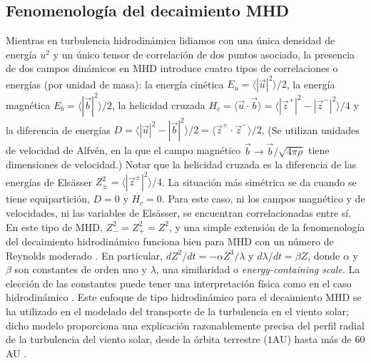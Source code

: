 \subsection{Fenomenología del decaimiento MHD}
Mientras en turbulencia hidrodinámica lidiamos con una única densidad
de energía $u^2$ y un único tensor de correlación de dos puntos
asociado, la presencia de dos campos dinámicos en MHD introduce cuatro
tipos de correlaciones o energías (por unidad de masa): la energía
cinética $E_u = \langle \left| \vec{u}\right|^2\rangle/2$, la energía
magnética $E_b = \langle \left| \vec{b}\right|^2\rangle/2$, la
helicidad cruzada $H_c = \langle \vec{u} \cdot \vec{b} \rangle =
\langle \left| \vec{z}^+\right|^2 - \left| \vec{z}^-\right|^2
\rangle/4$ y la diferencia de energías $D = \langle \left|
\vec{u}\right|^2 - \left| \vec{b} \right|^2 \rangle/2 = \langle
\vec{z}^+ \cdot \vec{z}^- \rangle/2$. (Se utilizan unidades de
velocidad de Alfvén, en la que el campo magnético $\vec{b} \rightarrow
\vec{b}/\sqrt{4\pi\rho}$ tiene dimensiones de velocidad.) Notar que la
helicidad cruzada es la diferencia de las energías de Els\"asser
$Z_\pm^2 = \langle \left| \vec{z}^\pm \right|^2 \rangle/4$. La
situación más simétrica se da cuando se tiene equipartición, $D = 0$ y
$H_c = 0$. Para este caso, ni los campos magnético y de velocidades,
ni las variables de Els\"asser, se encuentran correlacionadas entre
sí. En este tipo de MHD, $Z_-^2 = Z_+^2 = Z^2$, y una simple extensión
de la fenomenología del decaimiento hidrodinámico funciona bien para
MHD con un número de Reynolds moderado
\cite{hossain_phenomenology_1995}. En particular, $dZ^2/dt = -\alpha
Z^3/\lambda$ y $d\lambda/dt = \beta Z$, donde $\alpha$ y $\beta$ son
constantes de orden uno y $\lambda$, una similaridad o
\textit{energy-containing scale}. La elección de las constantes puede
tener una interpretación física como en el caso hidrodinámico
\cite{matthaeus_anisotropic_1996}. Este enfoque de tipo hidrodinámico
para el decaimiento MHD se ha utilizado en el modelado del transporte
de la turbulencia en el viento solar; dicho modelo proporciona una
explicación razonablemente precisa del perfil radial de la turbulencia
del viento solar, desde la órbita terrestre ($1$AU) hasta más de
$60$AU \cite{smith_heating_2001}.

